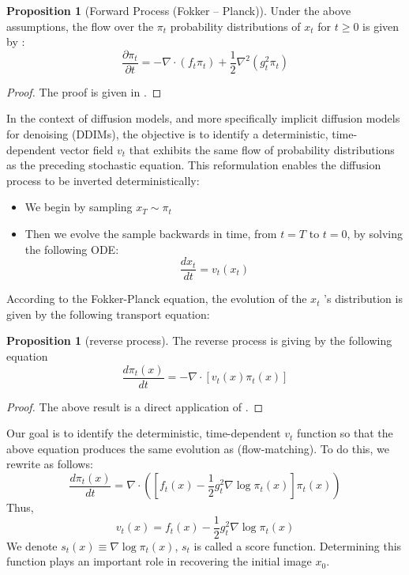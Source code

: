 \documentclass[a4paper,10pt]{article}
\theoremstyle{definition} %
\theoremstyle{definition} %
\newtheorem{proposition}[definition]{Proposition}
\theoremstyle{definition} %
\theoremstyle{definition} %
\newcommand{\0}{\boldsymbol{0}}
\begin{document}
\begin{proposition}[Forward Process (Fokker – Planck)\label{prop:fokker}] 
    Under the above assumptions, the flow over the $\pi_t$ probability distributions of $x_t$ for $t \geq 0$ is given by :    \begin{equation}\label{eq:Fokker-Planck}
        \frac{\partial\pi_t}{\partial t} = -\nabla \cdot (f_t \pi_t) + \frac{1}{2}\nabla^2(g_t^2\pi_t)
    \end{equation}
\end{proposition}
\begin{proof}
    The proof is given in .
\end{proof}
In the context of diffusion models, and more specifically implicit diffusion models for denoising (DDIMs), the objective is to identify a deterministic, time-dependent vector field $v_t$ that exhibits the same flow of probability distributions as the preceding stochastic equation. This reformulation enables the diffusion process to be inverted deterministically:
\begin{itemize}
    \item[] We begin by sampling $x_T \sim \pi_t$
    \item[] Then we evolve the sample backwards in time, from $t=T$ to $t = 0$, by solving the following ODE:
    \begin{equation}
        \frac{dx_t}{dt} = v_t(x_t)
    \end{equation}
\end{itemize}
According to the Fokker-Planck equation, the evolution of the $x_t$ 's distribution is given by the following transport equation:
\begin{proposition}[reverse process\label{prop:fokker}] 
The reverse process is giving by the following equation
\[\frac{d\pi_t(x)}{dt} =-\nabla \cdot [v_t(x)\pi_t(x)]\]
\end{proposition}
\begin{proof}
    The above result is a direct application of .
\end{proof}
Our goal is to identify the deterministic, time-dependent $v_t$ function so that the above equation produces the same evolution as  (flow-matching). To do this, we rewrite  as follows:
\[\frac{d\pi_t(x)}{dt} =\nabla \cdot([f_t(x)-\frac{1}{2}g_t^2\nabla \log\pi_t(x)]\pi_t(x))\]
Thus,
\[v_t(x) =f_t(x)-\frac{1}{2}g_t^2\nabla \log\pi_t(x) \]
We denote $s_t(x) \equiv \nabla \log\pi_t(x)$, $s_t$ is called a score function. Determining this function plays an important role in recovering the initial image $x_0$.
\end{document}
